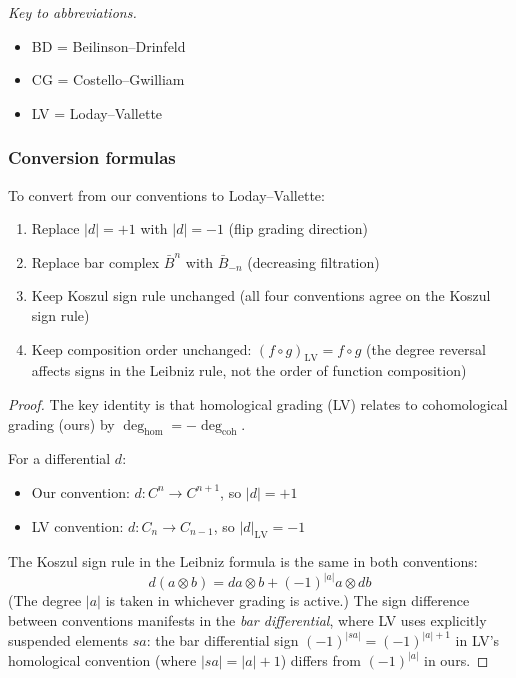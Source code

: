 \emph{Key to abbreviations.}
\begin{itemize}
\item BD = Beilinson--Drinfeld \cite{BD04}
\item CG = Costello--Gwilliam \cite{CG17}
\item LV = Loday--Vallette \cite{LV12}
\end{itemize}

\subsubsection{Conversion formulas}

\begin{proposition}\label{prop:LV-conversion-complete}
To convert from our conventions to Loday--Vallette:
\begin{enumerate}
\item Replace $|d| = +1$ with $|d| = -1$ (flip grading direction)
\item Replace bar complex $\bar{B}^n$ with $\bar{B}_{-n}$ (decreasing filtration)
\item Keep Koszul sign rule unchanged (all four conventions agree on the Koszul sign rule)
\item Keep composition order unchanged: $(f \circ g)_{\text{LV}} = f \circ g$ (the degree reversal affects signs in the Leibniz rule, not the order of function composition)
\end{enumerate}
\end{proposition}

\begin{proof}
The key identity is that homological grading (LV) relates to cohomological grading
(ours) by $\deg_{\text{hom}} = -\deg_{\text{coh}}$.

For a differential $d$:
\begin{itemize}
\item Our convention: $d: C^n \to C^{n+1}$, so $|d| = +1$
\item LV convention: $d: C_n \to C_{n-1}$, so $|d|_{\text{LV}} = -1$
\end{itemize}

The Koszul sign rule in the Leibniz formula is the same in both conventions:
\[d(a \otimes b) = da \otimes b + (-1)^{|a|} a \otimes db\]
(The degree $|a|$ is taken in whichever grading is active.) The sign difference between conventions manifests in the \emph{bar differential}, where LV uses explicitly suspended elements $sa$: the bar differential sign $(-1)^{|sa|} = (-1)^{|a|+1}$ in LV's homological convention (where $|sa| = |a|+1$) differs from $(-1)^{|a|}$ in ours.
\end{proof}

